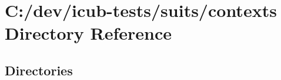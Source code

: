 \section{C\+:/dev/icub-\/tests/suits/contexts Directory Reference}
\label{dir_f69af4b29e11ba6afb4a6fff3d9a4b7c}
\subsection*{Directories}
\begin{DoxyCompactItemize}
\end{DoxyCompactItemize}
